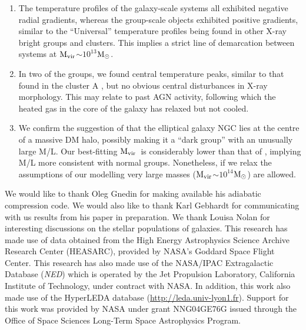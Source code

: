 \documentclass{emulateapj}
\def \msun {${\rm M_\odot}$}
\newcommand{\mvir}{${\rm M_{vir}}$}
\newcommand{\fbaryons}{${\rm f_{b}}$}
\newcommand{\ned}{{\em{NED}}}
\newcommand{\thin}{\thinspace}
\begin{document}
\begin{enumerate}
\fbaryons $\sim$0.04--0.09 for each galaxy,
implying that feedback has played an important role in the evolution
of these systems.
\item The temperature profiles of the galaxy-scale systems all
exhibited negative radial gradients, whereas the group-scale objects
exhibited positive gradients, similar to the ``Universal'' temperature
profiles being found in other X-ray bright groups and clusters.
This implies a strict line of demarcation between systems at \mvir $\sim 10^{13}$\msun.
\item In two of the groups, we found central temperature peaks, similar
to that found in the cluster A\thin 644 \citep{buote05a}, but 
no obvious central disturbances in X-ray morphology. This may
relate to past AGN activity, following which the heated gas in the 
core of the galaxy has relaxed but not
cooled.
\item We confirm the suggestion of \citet{gould93a} that the 
elliptical galaxy NGC\thin 1407 lies at the centre of a massive
DM halo, possibly making it a ``dark 
group'' with an unusually large M/L.
Our best-fitting \mvir\ is considerably lower than that 
of \citeauthor{gould93a}, implying M/L more consistent
with normal groups.
Nonetheless, if we relax
the assumptions of our modelling very large masses 
(\mvir$\sim 10^{14}$\msun) are allowed.
\end{enumerate}


\begin{acknowledgements}
We would like to thank Oleg Gnedin for making available his adiabatic compression code. We would also like to thank  Karl Gebhardt for communicating with us 
results from his paper in preparation.
We  thank Louisa Nolan for interesting
discussions on the stellar populations of galaxies. 
This research has made use of data obtained from the High Energy Astrophysics 
Science Archive Research Center (HEASARC), provided by NASA's Goddard Space 
Flight Center.
This research has also made use of the NASA/IPAC Extragalactic Database (\ned)
which is operated by the Jet Propulsion Laboratory, California Institute of
Technology, under contract with NASA. 
In addition, this work also made use of the HyperLEDA database
(\href{http://leda.univ-lyon1.fr}{http://leda.univ-lyon1.fr}).
Support for this work was provided by NASA under grant 
NNG04GE76G issued through the Office of Space Sciences Long-Term
Space Astrophysics Program.
\end{acknowledgements}


\appendix
\end{document}
